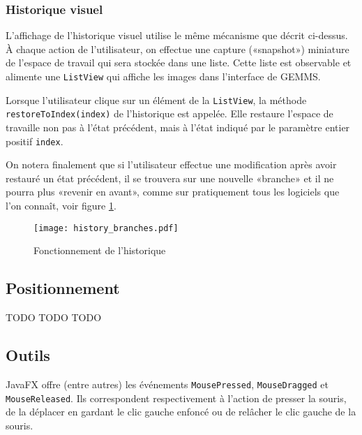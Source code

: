 \subsubsection{Historique visuel}
L'affichage de l'historique visuel utilise le même mécanisme que décrit ci-dessus. À chaque action de l'utilisateur, on effectue une capture («snapshot») miniature de l'espace de travail qui sera stockée dans une liste. Cette liste est observable et alimente une \texttt{ListView} qui affiche les images dans l'interface de GEMMS.

Lorsque l'utilisateur clique sur un élément de la \texttt{ListView}, la méthode \texttt{restoreToIndex(index)} de l'historique est appelée. Elle restaure l'espace de travaille non pas à l'état précédent, mais à l'état indiqué par le paramètre entier positif \texttt{index}.

On notera finalement que si l'utilisateur effectue une modification après avoir restauré un état précédent, il se trouvera sur une nouvelle «branche» et il ne pourra plus «revenir en avant», comme sur pratiquement tous les logiciels que l'on connaît, voir figure \ref{fig:hist_branches}.

\begin{figure}[h]
    \caption{Fonctionnement de l'historique}
    \centering
    \texttt{[image: history\_branches.pdf]}
    \label{fig:hist_branches}
\end{figure}

\subsection{Positionnement}
TODO TODO TODO

\subsection{Outils}
\par
JavaFX offre (entre autres) les événements \texttt{MousePressed}, \texttt{MouseDragged} et \texttt{MouseReleased}. Ils correspondent respectivement à l'action de presser la souris, de la déplacer en gardant le clic gauche enfoncé ou de relâcher le clic gauche de la souris.
